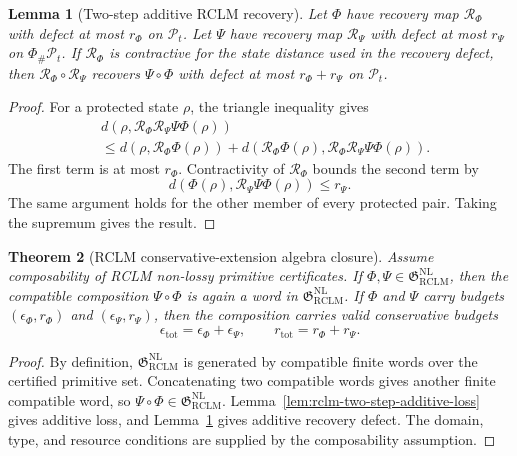 \documentclass[11pt,a4paper]{article}
\newtheorem{theorem}{Theorem}[section]
\newtheorem{lemma}[theorem]{Lemma}
\newcommand{\Pcal}{\mathcal P}
\newcommand{\RCLM}{\mathrm{RCLM}}
\newcommand{\tot}{\mathrm{tot}}
\newcommand{\NL}{\mathrm{NL}}
\begin{document}
\begin{lemma}[Two-step additive RCLM recovery]
\label{lem:rclm-two-step-additive-recovery}
Let \(\Phi\) have recovery map \(\mathcal R_\Phi\) with defect at most \(r_\Phi\) on \(\Pcal_t\).  Let \(\Psi\) have recovery map \(\mathcal R_\Psi\) with defect at most \(r_\Psi\) on \(\Phi_\#\Pcal_t\).  If \(\mathcal R_\Phi\) is contractive for the state distance used in the recovery defect, then \(\mathcal R_\Phi\circ\mathcal R_\Psi\) recovers \(\Psi\circ\Phi\) with defect at most \(r_\Phi+r_\Psi\) on \(\Pcal_t\).
\end{lemma}

\begin{proof}
For a protected state \(\rho\), the triangle inequality gives
\[
\begin{aligned}
&d(\rho,\mathcal R_\Phi\mathcal R_\Psi\Psi\Phi(\rho))\\
&\le d(\rho,\mathcal R_\Phi\Phi(\rho))
+d(\mathcal R_\Phi\Phi(\rho),\mathcal R_\Phi\mathcal R_\Psi\Psi\Phi(\rho)).
\end{aligned}
\]
The first term is at most \(r_\Phi\).  Contractivity of \(\mathcal R_\Phi\) bounds the second term by
\[
d(\Phi(\rho),\mathcal R_\Psi\Psi\Phi(\rho))\le r_\Psi.
\]
The same argument holds for the other member of every protected pair.  Taking the supremum gives the result.
\end{proof}

\begin{theorem}[RCLM conservative-extension algebra closure]
\label{thm:rclm-conservative-extension-algebra-closure}
Assume composability of RCLM non-lossy primitive certificates.  If \(\Phi,\Psi\in\mathfrak G_{\RCLM}^{\NL}\), then the compatible composition \(\Psi\circ\Phi\) is again a word in \(\mathfrak G_{\RCLM}^{\NL}\).  If \(\Phi\) and \(\Psi\) carry budgets \((\epsilon_\Phi,r_\Phi)\) and \((\epsilon_\Psi,r_\Psi)\), then the composition carries valid conservative budgets
\[
\epsilon_{\tot}=\epsilon_\Phi+\epsilon_\Psi,
\qquad
r_{\tot}=r_\Phi+r_\Psi.
\]
\end{theorem}

\begin{proof}
By definition, \(\mathfrak G_{\RCLM}^{\NL}\) is generated by compatible finite words over the certified primitive set.  Concatenating two compatible words gives another finite compatible word, so \(\Psi\circ\Phi\in\mathfrak G_{\RCLM}^{\NL}\).  Lemma~\ref{lem:rclm-two-step-additive-loss} gives additive loss, and Lemma~\ref{lem:rclm-two-step-additive-recovery} gives additive recovery defect.  The domain, type, and resource conditions are supplied by the composability assumption.
\end{proof}
\end{document}
